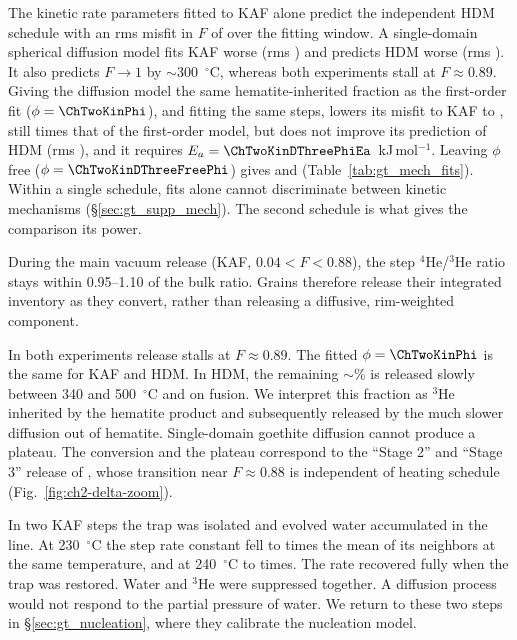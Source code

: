 The kinetic rate parameters fitted to KAF alone predict the independent HDM schedule with an rms misfit in
$F$ of \ChTwoKinFOneRmsHDM{} over the fitting window. A single-domain spherical diffusion model fits KAF worse
(rms \ChTwoKinDThreeRmsKAF) and predicts HDM worse (rms \ChTwoKinDThreeRmsHDM). It also predicts $F\to1$ by
$\sim$300~$^\circ$C, whereas both experiments stall at $F\approx0.89$. Giving the diffusion model the
same hematite-inherited fraction as the first-order fit ($\phi = \ChTwoKinPhi$), and fitting the same
steps, lowers its misfit to KAF to \ChTwoKinDThreePhiRmsKAF, still \ChTwoKinDThreePhiRmsRatio{} times that
of the first-order model, but does not improve its prediction of HDM (rms \ChTwoKinDThreePhiRmsHDM), and it
requires $E_a = \ChTwoKinDThreePhiEa$~kJ\,mol$^{-1}$. Leaving $\phi$ free
($\phi = \ChTwoKinDThreeFreePhi$) gives \ChTwoKinDThreeFreeRmsKAF{} and \ChTwoKinDThreeFreeRmsHDM
(Table~\ref{tab:gt_mech_fits}). Within a single schedule, fits alone cannot discriminate
between kinetic mechanisms (\S\ref{sec:gt_supp_mech}). The second schedule is what gives the
comparison its power.

During the main vacuum release (KAF, $0.04<F<0.88$), the step $^4$He/$^3$He ratio stays within
0.95--1.10 of the bulk ratio. Grains therefore release their integrated inventory as they
convert, rather than releasing a diffusive, rim-weighted component.

In both experiments release stalls at $F\approx0.89$. The fitted $\phi=\ChTwoKinPhi$ is the same for KAF
and HDM. In HDM, the remaining $\sim$\ChTwoKinPhiPct\% is released slowly between 340 and 500~$^\circ$C and on
fusion. We interpret this fraction as $^3$He inherited by the hematite product and subsequently
released by the much slower diffusion out of hematite. Single-domain goethite diffusion cannot
produce a plateau. The conversion and the plateau correspond to the ``Stage 2'' and
``Stage 3'' release of \citet{farley2024}, whose transition near $F\approx0.88$ is independent of
heating schedule (Fig.~\ref{fig:ch2-delta-zoom}).

In two KAF steps the trap was isolated and evolved water accumulated in the line. At
230~$^\circ$C the step rate constant fell to \ChTwoKinTrapSuppLow{} times the mean of its neighbors at the same
temperature, and at 240~$^\circ$C to \ChTwoKinTrapSuppHigh{} times. The rate recovered fully when the trap was
restored. Water and $^3$He were suppressed together. A diffusion process would not respond to
the partial pressure of water. We return to these two steps in \S\ref{sec:gt_nucleation}, where
they calibrate the nucleation model.

